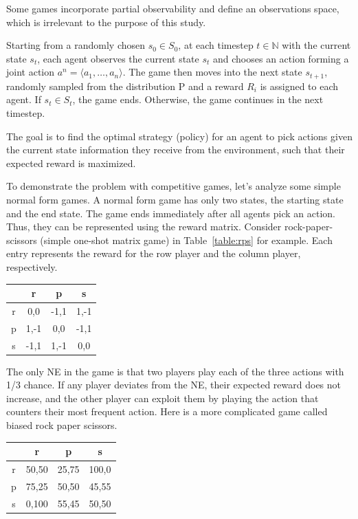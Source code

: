 \documentclass[a4paper]{article}
\begin{document}
\begin{multicols}{2}
\begin{itemize}
    Some games incorporate partial observability and define an observations space, which is irrelevant to the purpose of this study.
\end{itemize}

 Starting from a randomly chosen $s_0 \in S_0$, at each timestep $t \in \mathbb{N}$ with the current state $s_t$, each agent observes the current state $s_t$ and chooses an action forming a joint action $a^n=\langle a_1,\ldots,a_n \rangle$. The game then moves into the next state $s_{t+1}$, randomly sampled from the distribution P and a reward $R_i$ is assigned to each agent. If $s_t \in S_t$, the game ends. Otherwise, the game continues in the next timestep.

The goal is to find the optimal strategy (policy) for an agent to pick actions given the current state information they receive from the environment, such that their expected reward is maximized.

To demonstrate the problem with competitive games, let's analyze some simple normal form games. A normal form game has only two states, the starting state and the end state. The game ends immediately after all agents pick an action. Thus, they can be represented using the reward matrix. Consider rock-paper-scissors (simple one-shot matrix game) in Table~\ref{table:rps} for example. Each entry represents the reward for the row player and the column player, respectively.

\noindent
\begin{minipage}{\columnwidth}
\label{table:rps}
\centering
\begin{tabular}{c|ccc}
    & r & p & s\\
    \hline
    r & 0,0 & -1,1 & 1,-1 \\
    p & 1,-1 & 0,0 & -1,1 \\
    s & -1,1 & 1,-1 & 0,0 \\
\end{tabular}
\end{minipage}

The only NE in the game is that two players play each of the three actions with 1/3 chance. If any player deviates from the NE, their expected reward does not increase, and the other player can exploit them by playing the action that counters their most frequent action. Here is a more complicated game called biased rock paper scissors.

\noindent
\begin{minipage}{\columnwidth}
\label{table:biasedrps}
\centering
\begin{tabular}{c|ccc}
    & r & p & s\\
    \hline
    r & 50,50 & 25,75 & 100,0 \\
    p & 75,25 & 50,50 & 45,55 \\
    s & 0,100 & 55,45 & 50,50 \\
\end{tabular}
\end{minipage}


\end{multicols}
\end{document}
